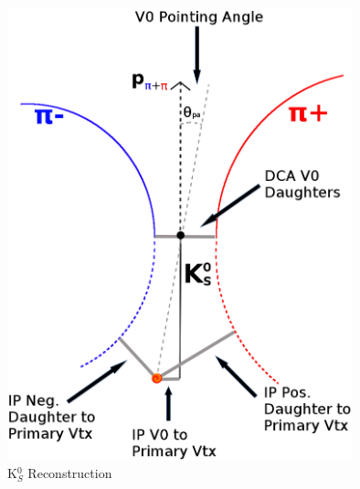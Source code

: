 \begin{figure}[h]
  \centering
  \includegraphics[width=100mm]{3_DataSelection/Figures/K0Cuts.png}
  \caption[K$^{0}_{S}$ Reconstruction]{K$^{0}_{S}$ Reconstruction}
  \label{fig:K0Reconstruction}
\end{figure}


